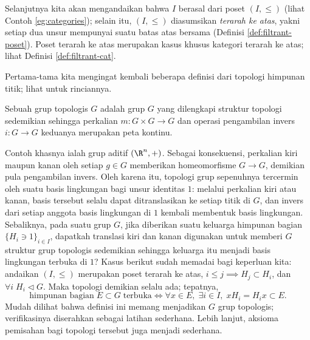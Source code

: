 Selanjutnya kita akan mengandaikan bahwa $I$ berasal dari poset $(I, \leq)$ (lihat Contoh \ref{eg:categories}); selain itu, $(I, \leq)$ diasumsikan \emph{terarah ke atas}, yakni setiap dua unsur mempunyai suatu batas atas bersama (Definisi \ref{def:filtrant-poset}). Poset terarah ke atas merupakan kasus khusus kategori terarah ke atas; lihat Definisi \ref{def:filtrant-cat}.

Pertama-tama kita mengingat kembali beberapa definisi dari topologi himpunan titik; lihat \cite[Bab I]{FL14} untuk rinciannya.
\begin{definition}\label{def:topological-group}
	Sebuah grup topologis $G$ adalah grup $G$ yang dilengkapi struktur topologi sedemikian sehingga perkalian $m: G \times G \to G$ dan operasi pengambilan invers $i: G \to G$ keduanya merupakan peta kontinu.
\end{definition}
Contoh khasnya ialah grup aditif $(\R^n, +)$. Sebagai konsekuensi, perkalian kiri maupun kanan oleh setiap $g \in G$ memberikan homeomorfisme $G \to G$, demikian pula pengambilan invers. Oleh karena itu, topologi grup sepenuhnya tercermin oleh suatu basis lingkungan bagi unsur identitas $1$: melalui perkalian kiri atau kanan, basis tersebut selalu dapat ditranslasikan ke setiap titik di $G$, dan invers dari setiap anggota basis lingkungan di $1$ kembali membentuk basis lingkungan. Sebaliknya, pada suatu grup $G$, jika diberikan suatu keluarga himpunan bagian $\{H_i \ni 1\}_{i \in I}$, dapatkah translasi kiri dan kanan digunakan untuk memberi $G$ struktur grup topologis sedemikian sehingga keluarga itu menjadi basis lingkungan terbuka di $1$? Kasus berikut sudah memadai bagi keperluan kita: andaikan $(I, \leq)$ merupakan poset terarah ke atas, $i \leq j \implies H_j \subset H_i$, dan $\forall i \; H_i \lhd G$. Maka topologi demikian selalu ada; tepatnya,
\[ \text{himpunan bagian}\; E \subset G\; \text{terbuka} \iff \forall x \in E, \; \exists i \in I, \; xH_i = H_i x \subset E. \]
Mudah dilihat bahwa definisi ini memang menjadikan $G$ grup topologis; verifikasinya diserahkan sebagai latihan sederhana. Lebih lanjut, aksioma pemisahan bagi topologi tersebut juga menjadi sederhana.


